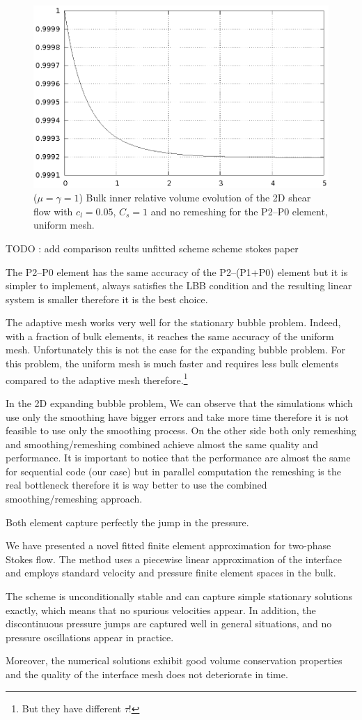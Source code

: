\documentclass[a4paper,12pt,onecolumn]{article}
\begin{document}
\begin{figure}[htbp]
  \centering
  \includegraphics[width=.45\textwidth]
  {figures/2d_shear_smooth_bulk_inner_volume.ps}
  \caption{($\mu=\gamma=1$) Bulk inner relative volume evolution of the 2D
shear flow with $c_l=0.05$, $C_s=1$ and no remeshing for the P2--P0 element,
uniform mesh.}
  \label{fig:shear_2d_smooth_bulk_inner_volume}
\end{figure}

TODO : add comparison reults unfitted scheme scheme stokes paper

The P2--P0 element has the same accuracy of the P2--(P1+P0) element but it is
simpler to implement, always satisfies the LBB condition and the resulting
linear system is smaller therefore it is the best choice.

The adaptive mesh works very well for the stationary bubble problem. Indeed,
with a fraction of bulk elements, it reaches the same accuracy of the uniform
mesh. Unfortunately this is not the case for the expanding bubble problem. For
this problem, the uniform mesh is much faster and requires less bulk elements
compared to the adaptive mesh therefore.\footnote{But they have different
$\tau$!}

In the 2D expanding bubble problem, We can observe that the simulations which
use only the smoothing have bigger errors and take more time therefore it is not
feasible to use only the smoothing process. On the other side both only
remeshing and smoothing/remeshing combined achieve almost the same quality and
performance. It is important to notice that the performance are almost the same
for sequential code (our case) but in parallel computation the remeshing is the
real bottleneck therefore it is way better to use the combined
smoothing/remeshing approach.

Both element capture perfectly the jump in the pressure.

We have presented a novel fitted finite element approximation for two-phase
Stokes flow. The method uses a piecewise linear approximation of the interface
and employs standard velocity and pressure finite element spaces in the bulk.

The scheme is unconditionally stable and can capture simple stationary
solutions exactly, which means that no spurious velocities appear. In addition,
the discontinuous pressure jumps are captured well in general situations, and
no pressure oscillations appear in practice.

Moreover, the numerical solutions exhibit good volume conservation properties
and the quality of the interface mesh does not deteriorate in time.
\end{document}
